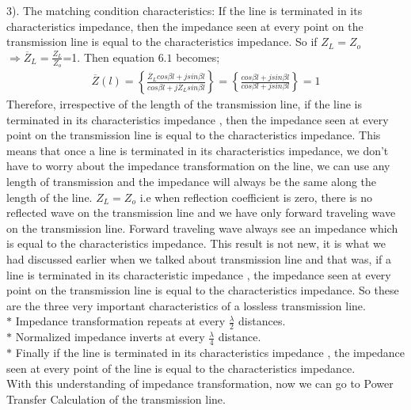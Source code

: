  3). The matching condition characteristics: If the line is terminated in its characteristics impedance, then the impedance seen at every point on the transmission line is equal to the characteristics impedance. So if $Z_L=Z_o$ $\Longrightarrow \overline{Z}_L= \frac{Z_L}{Z_o}$=1. Then equation $6.1$ becomes;
\begin{align*}
\overline{Z}(l) = \left\lbrace \frac{\overline{Z}_Lcos\beta l + jsin\beta l}{cos\beta l + j\overline{Z}_Lsin\beta l}\right\rbrace = \left\lbrace \frac{cos\beta l + jsin\beta l}{cos\beta l + jsin\beta l}\right\rbrace = 1
\end{align*}
Therefore, irrespective of the length of the transmission line, if the line is terminated in its characteristics impedance , then the impedance seen at every point on the transmission line is equal to the characteristics impedance. This means that once a line is terminated in its characteristics impedance, we don't have to worry about the impedance transformation on the line, we can use any length of transmission and the impedance will always be the same along the length of the line. $Z_L=Z_o$ i.e when reflection coefficient is zero, there is no reflected wave on the transmission line and we have only forward traveling wave on the transmission line. Forward traveling wave always see an impedance which is equal to the characteristics impedance. This result is not new, it is what we had discussed earlier when we talked about transmission line and that was, if a line is terminated in its characteristic impedance , the impedance seen at every point on the transmission line is equal to the characteristics impedance. So these are the three very important characteristics of a lossless transmission line. \\
  
$\ast$ Impedance transformation repeats at every $\frac{\lambda}{2}$ distances.\\

$\ast$ Normalized impedance inverts at every $\frac{\lambda}{4}$ distance.\\
  
$\ast$ Finally if the line is terminated in its characteristics impedance , the impedance seen at every point of the line is equal to the characteristics impedance.
 \\
 
 With this understanding of impedance transformation, now we can go to Power Transfer Calculation of the transmission line.\\
 
